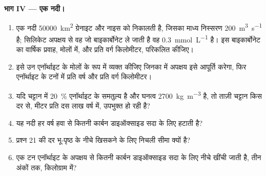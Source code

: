 \begin{problem}
\medskip
\noindent\textbf{भाग IV --- एक नदी।}
\begin{enumerate}[resume]
  \item एक नदी \qty{50000}{km^2} ग्रेनाइट और नाइस को निकालती है, जिसका माध्य निस्सरण \qty{200}{m^3.s^{-1}} है; सिलिकेट अपक्षय से वह जो बाइकार्बोनेट ले जाती है वह \qty{0.3}{mmol.L^{-1}} है। इस बाइकार्बोनेट का वार्षिक प्रवाह, मोलों में, और प्रति वर्ग किलोमीटर, परिकलित कीजिए।
  \item इसे उन एनॉर्थाइट के मोलों के रूप में व्यक्त कीजिए जिनका  में अपक्षय इसे आपूर्ति करेगा, फिर एनॉर्थाइट के टनों में प्रति वर्ष और प्रति वर्ग किलोमीटर।
  \item यदि चट्टान में \qty{20}{\percent} एनॉर्थाइट के समतुल्य है और घनत्व \qty{2700}{kg.m^{-3}} है, तो ताज़ी चट्टान किस दर से, मीटर प्रति दस लाख वर्ष में, उपभुक्त हो रही है?
  \item यह नदी हर वर्ष हवा से कितनी कार्बन डाइऑक्साइड सदा के लिए हटाती है?
  \item प्रश्न 21 की दर भू-पृष्ठ के नीचे खिसकने के लिए निचली सीमा क्यों है?
  \item एक टन एनॉर्थाइट के अपक्षय से कितनी कार्बन डाइऑक्साइड सदा के लिए नीचे खींची जाती है, तीन अंकों तक, किलोग्राम में?
\end{enumerate}
\end{problem}
